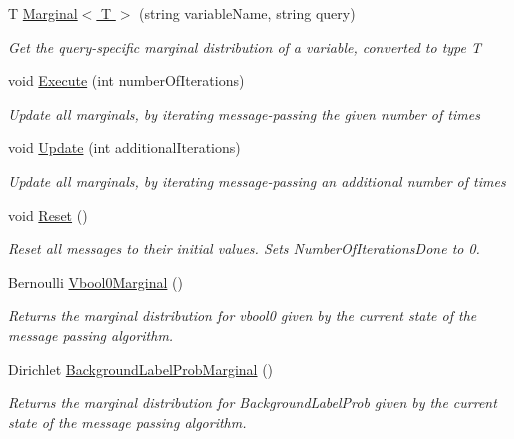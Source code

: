 \begin{DoxyCompactItemize}
T \hyperlink{class_microsoft_research_1_1_infer_1_1_models_1_1_user_1_1_model___e_p_a5db0c41c9cd8c0896fea19890bf0184d}{Marginal$<$ T $>$} (string variable\+Name, string query)
\begin{DoxyCompactList}\small\item\em Get the query-\/specific marginal distribution of a variable, converted to type T\end{DoxyCompactList}\item 
void \hyperlink{class_microsoft_research_1_1_infer_1_1_models_1_1_user_1_1_model___e_p_a0555bf326d664050cd8706fe1ad718c9}{Execute} (int number\+Of\+Iterations)
\begin{DoxyCompactList}\small\item\em Update all marginals, by iterating message-\/passing the given number of times\end{DoxyCompactList}\item 
void \hyperlink{class_microsoft_research_1_1_infer_1_1_models_1_1_user_1_1_model___e_p_a666059fedd70c6ebafb77b7ba98adc35}{Update} (int additional\+Iterations)
\begin{DoxyCompactList}\small\item\em Update all marginals, by iterating message-\/passing an additional number of times\end{DoxyCompactList}\item 
void \hyperlink{class_microsoft_research_1_1_infer_1_1_models_1_1_user_1_1_model___e_p_a9b5187d265d55326778d4ed5144dafc9}{Reset} ()
\begin{DoxyCompactList}\small\item\em Reset all messages to their initial values. Sets Number\+Of\+Iterations\+Done to 0.\end{DoxyCompactList}\item 
Bernoulli \hyperlink{class_microsoft_research_1_1_infer_1_1_models_1_1_user_1_1_model___e_p_a4ec19be7ea41aaa244b21163ede5ef74}{Vbool0\+Marginal} ()
\begin{DoxyCompactList}\small\item\em Returns the marginal distribution for \textquotesingle{}vbool0\textquotesingle{} given by the current state of the message passing algorithm. \end{DoxyCompactList}\item 
Dirichlet \hyperlink{class_microsoft_research_1_1_infer_1_1_models_1_1_user_1_1_model___e_p_a952c766daae4076480acb780851fb3ad}{Background\+Label\+Prob\+Marginal} ()
\begin{DoxyCompactList}\small\item\em Returns the marginal distribution for \textquotesingle{}Background\+Label\+Prob\textquotesingle{} given by the current state of the message passing algorithm. \end{DoxyCompactList}\item 

\end{DoxyCompactItemize}
